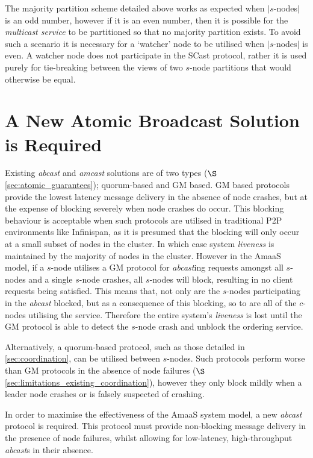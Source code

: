     The majority partition scheme detailed above works as expected when $|s$-nodes$|$ is an odd number, however if it is an even number, then it is possible for the \emph{multicast service} to be partitioned so that no majority partition exists.  To avoid such a scenario it is necessary for a \textquoteleft{}watcher' node to be utilised when $|s$-nodes$|$ is even.  A watcher node does not participate in the \textsf{SCast} protocol, rather it is used purely for tie-breaking between the views of two $s$-node partitions that would otherwise be equal.  
    
\section{A New Atomic Broadcast Solution is Required}
Existing \emph{abcast} and \emph{amcast} solutions are of two types ($\S$ \ref{sec:atomic_guarantees}); quorum-based and GM based.  GM based protocols provide the lowest latency message delivery in the absence of node crashes, but at the expense of blocking severely when node crashes do occur.  This blocking behaviour is acceptable when such protocols are utilised in traditional P2P environments like Infinispan, as it is presumed that the blocking will only occur at a small subset of nodes in the cluster.  In which case system \emph{liveness} is maintained by the majority of nodes in the cluster.  However in the \textsf{AmaaS} model, if a $s$-node utilises a GM protocol for \emph{abcast}ing requests amongst all $s$-nodes and a single $s$-node crashes, all $s$-nodes will block, resulting in no client requests being satisfied. This means that, not only are the $s$-nodes participating in the \emph{abcast} blocked, but as a consequence of this blocking, so to are all of the $c$-nodes utilising the service.  Therefore the entire system's \emph{liveness} is lost until the GM protocol is able to detect the $s$-node crash and unblock the ordering service.  

Alternatively, a quorum-based protocol, such as those detailed in \ref{sec:coordination}, can be utilised between $s$-nodes.  Such protocols perform worse than GM protocols in the absence of node failures ($\S$ \ref{sec:limitations_existing_coordination}), however they only block mildly when a leader node crashes or is falsely suspected of crashing.  

In order to maximise the effectiveness of the \textsf{AmaaS} system model, a new \emph{abcast} protocol is required.  This protocol must provide non-blocking message delivery in the presence of node failures, whilst allowing for low-latency, high-throughput \emph{abcast}s in their absence.  

